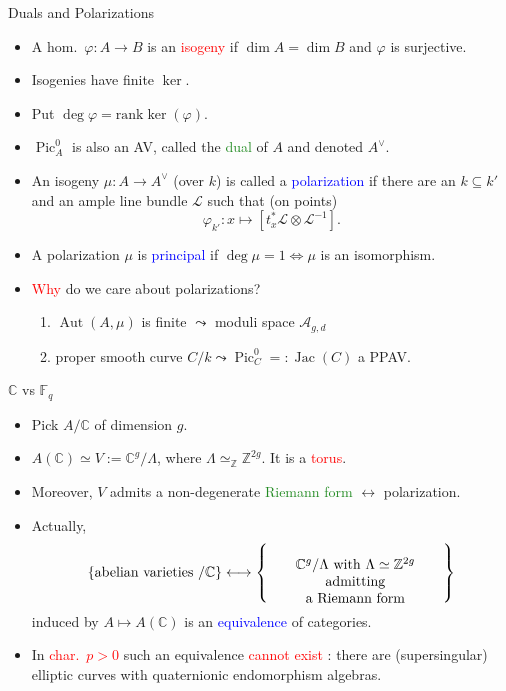 \documentclass[usenames,dvipsnames,handout]{beamer}
\def\Z{\mathbb{Z}}
\def\C{\mathbb{C}}
\def\F{\mathbb{F}}
\DeclareMathOperator{\Pic}{Pic}
\DeclareMathOperator{\Aut}{Aut}
\DeclareMathOperator{\Jac}{Jac}
\newcommand{\vphi}{\varphi}
\newcommand{\set}[1]{\left\lbrace#1\right\rbrace }
\newcommand{\red}[1]{\textcolor{red}{#1}}
\newcommand{\blue}[1]{\textcolor{blue}{#1}}
\newcommand{\green}[1]{\textcolor{ForestGreen}{#1}}
\begin{document}
\begin{frame}{ Duals and Polarizations }
    \begin{itemize}
     \item A hom.~$\vphi:A\to B$ is an \red{isogeny} if $\dim A = \dim B$ and $\vphi$ is surjective.
     \pause \item Isogenies have finite $\ker$.
     \pause \item Put $\deg\vphi = \mathrm{rank}\ker(\vphi)$.	
	 \pause \item $\Pic^0_{A}$ is also an AV, called the \green{dual} of $A$ and denoted $A^\vee$.	 
	 \pause \item An isogeny $\mu:A\to A^\vee$ (over $k$) is called a \blue{polarization} if 
     there are an $k\subseteq k'$ and an ample line bundle $\mathcal{L}$ such that (on points)
     \[ \vphi_{k'}: x\mapsto [t_x^*\mathcal{L} \otimes\mathcal{L}^{-1} ]. \]
	 \pause \item A polarization $\mu$ is \blue{principal} if $\deg \mu = 1 \iff \mu$ is an isomorphism.
	 \pause \item \red{Why} do we care about polarizations?
        \begin{enumerate}
    	 \pause \item $\Aut(A,\mu)$ is finite $\leadsto$ moduli space $\mathcal{A}_{g,d}$
    	 \pause \item proper smooth curve $C/k \leadsto \Pic^0_{C}=:\Jac(C)$ a PPAV.
    	\end{enumerate}
	\end{itemize}
\end{frame}


\begin{frame}{ $\C$ vs $\F_q$ }    
    \begin{itemize}
     \item Pick $A/\C$ of dimension $g$. 
	 \pause \item $A(\C)\simeq V:=\C^g/\Lambda$, where $\Lambda\simeq_\Z\Z^{2g}$. It is a \red{torus}.
	 \pause \item Moreover, $V$ admits a non-degenerate \green{Riemann form} $\longleftrightarrow$ polarization.
	 \pause \item Actually,
	  \[
      \set{ \text{abelian varieties $/\C$} } \longleftrightarrow 
      \set{\parbox[c]{12.5em}{\center $\C^g/\Lambda$ with $\Lambda\simeq \Z^{2g}$ admitting\\ a Riemann form}}
     \]
	  induced by $ A \mapsto A(\C)$ is an \blue{equivalence} of categories.
	 \pause \item In \red{char.~$p>0$} such an equivalence \red{cannot exist} : there are (supersingular) elliptic curves with quaternionic endomorphism algebras.
	\end{itemize}
\end{frame}
\end{document}
